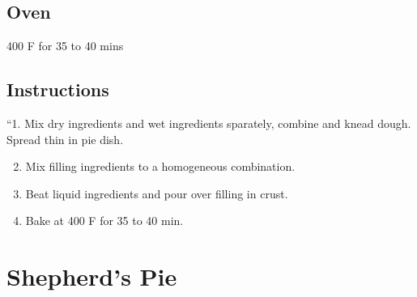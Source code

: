 \documentclass[letterpaper,10pt,english]{sphinxmanual}
\begin{document}
\section{Oven}
\label{\detokenize{Quiche:oven}}
400 F for 35 to 40 mins


\section{Instructions}
\label{\detokenize{Quiche:instructions}}
“1. Mix dry ingredients and wet ingredients sparately, combine and knead dough. Spread thin in pie dish.
\begin{enumerate}
\setcounter{enumi}{1}
\item {} 
Mix filling ingredients to a homogeneous combination.

\item {} 
Beat liquid ingredients and pour over filling in crust.

\item {} 
Bake at 400 F for 35 to 40 min.

\end{enumerate}


\chapter{Shepherd’s Pie}
\label{\detokenize{Shep_Pie:shepherd-s-pie}}\label{\detokenize{Shep_Pie::doc}}
\end{document}
